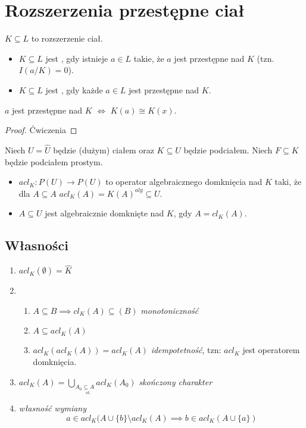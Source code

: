 \section{Rozszerzenia przestępne ciał}
$K\subseteq L$ to rozszerzenie ciał.

\begin{bbox}
    \begin{itemize}
        \item[\PHtunny] $K\subseteq L$ jest , gdy istnieje $a\in L$ takie, że $a$ jest przestępne nad $K$ (tzn. $I(a/K)=0$).
        \item[\PHtunny] $K\subseteq L$ jest , gdy każde $a\in L$ jest przestępne nad $K$.
    \end{itemize}
\end{bbox}

\begin{remark}
$a$ jest przestępne nad $K$ $\iff$ $K(a)\cong K(x)$.
\end{remark}
\begin{proof}
Ćwiczenia
\end{proof}

Niech $U=\hat{U}$ będzie (dużym) ciałem oraz $K\subseteq U$ będzie podciałem. Niech $F\subseteq K$ będzie podciałem prostym.
\begin{bbox}
\begin{itemize}
    \item[\PHtunny] $acl_K:P(U)\to P(U)$ to operator algebraicznego domknięcia nad $K$ taki, że dla $A\subseteq A$ $acl_K(A)=K(A)^{alg}\subseteq U$.
    \item[\PHtunny] $A\subseteq U$ jest algebraicznie domknięte nad $K$, gdy $A=cl_K(A)$.
\end{itemize}
\end{bbox}

\subsection{Własności}
\begin{enumerate}
    \item $acl_K(\emptyset)=\hat{K}$
    \item 
        \begin{enumerate}
            \item $A\subseteq B\implies cl_K(A)\subseteq(B)$ \emph{monotoniczność}
            \item $A\subseteq acl_K(A)$
            \item $acl_K(acl_K(A))=acl_K(A)$ \emph{idempotetność}, tzn: $acl_K$ jest operatorem domknięcia.
        \end{enumerate}
    \item $acl_K(A)=\bigcup_{A_0\underset{sk.}{\subseteq A}}acl_K(A_0)$ \emph{skończony charakter}
    \item \emph{własność wymiany}
    $$a\in acl_K(A\cup\{b\}\setminus acl_K(A)\implies b\in acl_K(A\cup \{a\})$$
\end{enumerate}


